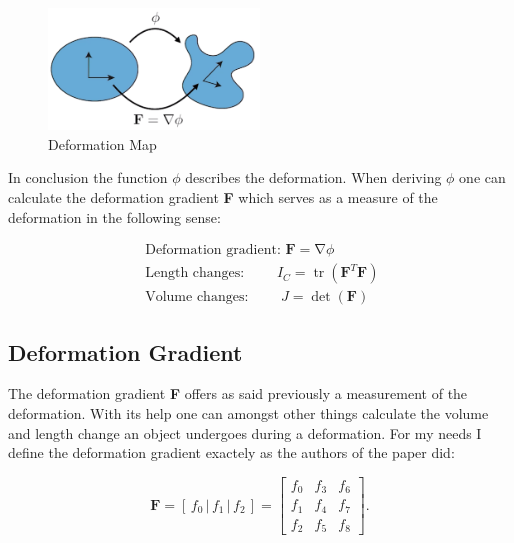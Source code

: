 \begin{figure}[!htbp]
	\centering
	\includegraphics[width=0.5\textwidth]{resources/deformation_map}
	\caption{Deformation Map {\cite{STREAM2018}}}
	\label{fig:deformationmap}
\end{figure}

In conclusion the function $\phi$ describes the deformation. When deriving $\phi$ one can calculate the deformation gradient \textbf{F} which serves as a measure of the deformation in the following sense: 

\[
\begin{array}{l}
{\text { Deformation gradient: }} {\mathbf{F}=\operatorname{\nabla} \phi}
\\
{\text { Length changes: }} {\qquad I_{C}=\operatorname{tr}\left(\mathbf{F}^{T} \mathbf{F}\right)} 
\\ 
{\text { Volume changes: }} {\qquad J=\operatorname{det}(\mathbf{F})}\end{array}
\]



\subsection{Deformation Gradient}
The deformation gradient \textbf{F} offers as said previously a measurement of the deformation. With its help one can amongst other things calculate the volume and length change an object undergoes during a deformation. For my needs I define the deformation gradient exactely as the authors of the paper \cite{Smith:2018:SNF:3191713.3180491} did:

\begin{equation}\label{eq:deformation_gradient}
\textbf{F} = \left[ \,f_0\, \bigg| \,f_1\, \bigg| \,f_2\, \right] = \begin{bmatrix} f_0 & f_3 & f_6 \\ f_1 & f_4 & f_7 \\ f_2 & f_5 & f_8 \end{bmatrix}.
\end{equation}

